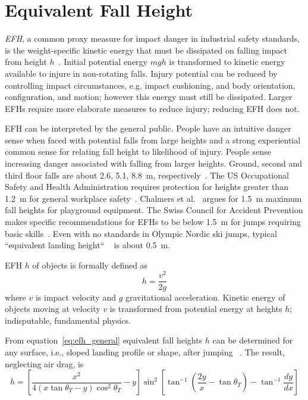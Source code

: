 \documentclass[smallextended]{svjour3}       %
\begin{document}
\section{Equivalent Fall Height}
\label{sec:efh}
%
\emph{EFH}, a common proxy measure for impact danger in industrial safety
standards, is the weight-specific kinetic energy that must be dissipated on
falling impact from height $h$~\cite{Muller1997,Hubbard2009,Gasser2018}.
Initial potential energy $mgh$ is transformed to kinetic energy available to injure in
non-rotating falls. Injury potential can be reduced by controlling impact
circumstances, e.g.  impact cushioning, and body orientation, configuration,
and motion; however this energy must still be dissipated. Larger EFHs require
more elaborate measures to reduce injury; reducing EFH does not.

EFH can be interpreted by the general public. People have an intuitive danger
sense when faced with potential falls from large heights and a strong
experiential common sense for relating fall height to likelihood of injury.
People sense increasing danger associated with falling from larger heights.
Ground, second and third floor falls are about 2.6, 5.1,
8.8~\si{\meter}, respectively~\cite{Vish2005}. The US Occupational Safety and Health
Administration requires protection for heights greater than
1.2~\si{\meter} for general workplace safety~\cite{OSHA2021}.  Chalmers et
al.~\cite{Chalmers1996} argues for 1.5~\si{\meter} maximum fall heights for
playground equipment. The Swiss Council for Accident Prevention makes specific
recommendations for EFHs to be below 1.5~\si{\meter} for jumps requiring basic
skills~\cite{Heer2019}. Even with no standards in Olympic Nordic ski jumps, typical 
``equivalent landing height``  ~\cite{Gasser2018} is about 0.5~\si{\meter}.

EFH $h$ of objects is formally defined as
%
\begin{equation} h = \frac{v^2}{2g} \label{eq:efh_general} \end{equation}
%
where $v$ is impact velocity and $g$ gravitational acceleration.
Kinetic energy of objects moving at  velocity $v$  is transformed from potential energy at heights $h$; indisputable, fundamental physics.

From equation~\ref{eq:efh_general} equivalent fall heights $h$ can be
determined for any surface, i.e., sloped landing profile or shape, after jumping
~\cite{Petrone2017}. The result, neglecting air drag, is
%
\begin{equation}
  h = \left[\frac{x^2}{4(x\tan\theta_T - y)\cos^{2}\theta_T} -
    y\right]\sin^{2}\left[\tan^{-1}\left(\frac{2y}{x}- \tan\theta_T\right) -
    \tan^{-1}\frac{dy}{dx}\right]
  \label{eq:efh}
\end{equation}
\end{document}
